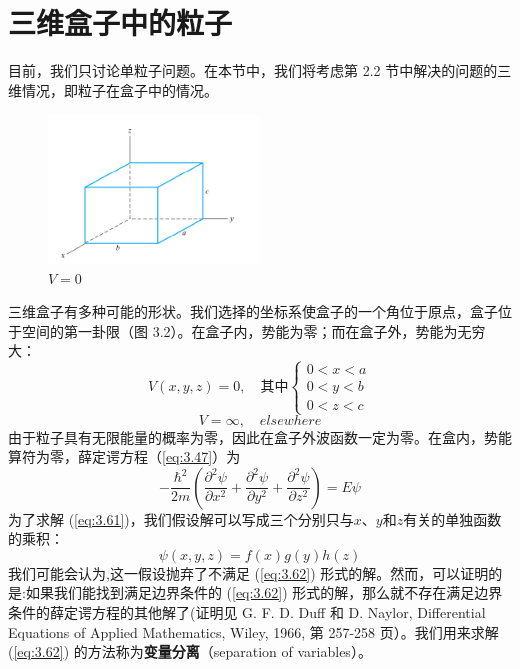 \section{三维盒子中的粒子}
	目前，我们只讨论单粒子问题。在本节中，我们将考虑第 2.2 节中解决的问题的三维情况，即粒子在盒子中的情况。\\
	\begin{figure}[h!]
		\centering
		\includegraphics[width=0.5\textwidth]{Figures/3.2.png}  %
		\caption{$V=0$}
		\label{fig:3.2}
	\end{figure}
	\indent 三维盒子有多种可能的形状。我们选择的坐标系使盒子的一个角位于原点，盒子位于空间的第一卦限（图 3.2）。在盒子内，势能为零；而在盒子外，势能为无穷大：
	\begin{equation}
		V\left(x,y,z\right) = 0, \quad \text{其中}
		\begin{cases}
			0 < x < a\\
			0 < y < b\\
			0 < z < c
		\end{cases}
		\label{eq:3.60}
	\end{equation}
	\begin{equation*}
		V = \infty, \quad elsewhere
	\end{equation*}
	\indent 由于粒子具有无限能量的概率为零，因此在盒子外波函数一定为零。在盒内，势能算符为零，薛定谔方程（\ref{eq:3.47}）为
	\begin{equation}
		-\frac{\hbar^2}{2m}\left(\frac{\partial^2\psi}{\partial x^2} + \frac{\partial^2\psi}{\partial y^2} + \frac{\partial^2\psi}{\partial z^2}\right) = E\psi
		\label{eq:3.61}
	\end{equation}
	为了求解 (\ref{eq:3.61})，我们假设解可以写成三个分别只与$x$、$y$和$z$有关的单独函数的乘积：
	\begin{equation}
		\psi\left(x,y,z\right) = f\left(x\right)g\left(y\right)h\left(z\right)
		\label{eq:3.62}
	\end{equation}
	我们可能会认为,这一假设抛弃了不满足 (\ref{eq:3.62}) 形式的解。然而，可以证明的是:如果我们能找到满足边界条件的 (\ref{eq:3.62}) 形式的解，那么就不存在满足边界条件的薛定谔方程的其他解了(证明见 G. F. D. Duff 和 D. Naylor, Differential Equations of Applied Mathematics, Wiley, 1966, 第 257-258 页）。我们用来求解 (\ref{eq:3.62}) 的方法称为\textbf{变量分离}（separation of variables）。\\
